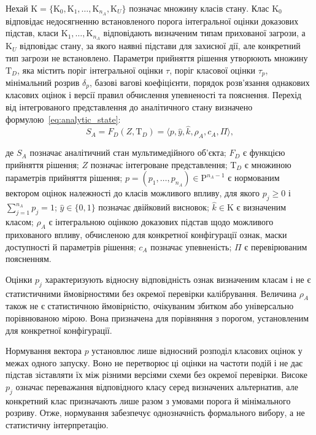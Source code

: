 Нехай $\mathrm K=\{\mathrm K_0,\mathrm K_1,\ldots,\mathrm K_{n_A},\mathrm K_U\}$ позначає множину класів стану. Клас $\mathrm K_0$ відповідає недосягненню встановленого порога інтегральної оцінки доказових підстав, класи $\mathrm K_1,\ldots,\mathrm K_{n_A}$ відповідають визначеним типам прихованої загрози, а $\mathrm K_U$ відповідає стану, за якого наявні підстави для захисної дії, але конкретний тип загрози не встановлено. Параметри прийняття рішення утворюють множину $\mathrm T_D$, яка містить поріг інтегральної оцінки $\tau$, поріг класової оцінки $\tau_p$, мінімальний розрив $\delta_p$, базові вагові коефіцієнти, порядок розв’язання однакових класових оцінок і версії правил обчислення упевненості та пояснення. Перехід від інтегрованого представлення до аналітичного стану визначено формулою~\eqref{eq:analytic_state}:
\begin{equation}
S_A=F_D(Z,\mathrm T_D)=\langle p,\hat y,\hat k,\rho_A,c_A,\Pi\rangle,
\label{eq:analytic_state}
\end{equation}

де $S_A$ позначає аналітичний стан мультимедійного об’єкта; $F_D$ є функцією прийняття рішення; $Z$ позначає інтегроване представлення; $\mathrm T_D$ є множиною параметрів прийняття рішення; $p=(p_1,\ldots,p_{n_A})\in\mathrm P^{n_A-1}$ є нормованим вектором оцінок належності до класів можливого впливу, для якого $p_j\geq0$ і $\sum_{j=1}^{n_A}p_j=1$; $\hat y\in\{0,1\}$ позначає двійковий висновок; $\hat k\in\mathrm K$ є визначеним класом; $\rho_A$ є інтегральною оцінкою доказових підстав щодо можливого прихованого впливу, обчисленою для конкретної конфігурації ознак, маски доступності й параметрів рішення; $c_A$ позначає упевненість; $\Pi$ є перевірюваним поясненням.

Оцінки $p_j$ характеризують відносну відповідність ознак визначеним класам і не є статистичними ймовірностями без окремої перевірки калібрування. Величина $\rho_A$ також не є статистичною ймовірністю, очікуваним збитком або універсально порівнюваною мірою. Вона призначена для порівняння з порогом, установленим для конкретної конфігурації.

Нормування вектора $p$ установлює лише відносний розподіл класових оцінок у межах одного запуску. Воно не перетворює ці оцінки на частоти подій і не дає підстав зіставляти їх між різними версіями схеми без окремої перевірки. Високе $p_j$ означає переважання відповідного класу серед визначених альтернатив, але конкретний клас призначають лише разом з умовами порога й мінімального розриву. Отже, нормування забезпечує однозначність формального вибору, а не статистичну інтерпретацію.

